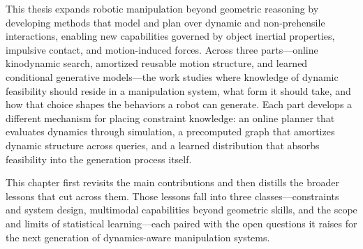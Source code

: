 This thesis expands robotic manipulation beyond geometric reasoning by developing methods that model and plan over dynamic and non-prehensile interactions, enabling new capabilities governed by object inertial properties, impulsive contact, and motion-induced forces.
Across three parts---online kinodynamic search, amortized reusable motion structure, and learned conditional generative models---the work studies where knowledge of dynamic feasibility should reside in a manipulation system, what form it should take, and how that choice shapes the behaviors a robot can generate.
Each part develops a different mechanism for placing constraint knowledge: an online planner that evaluates dynamics through simulation, a precomputed graph that amortizes dynamic structure across queries, and a learned distribution that absorbs feasibility into the generation process itself.

This chapter first revisits the main contributions and then distills the broader lessons that cut across them.
Those lessons fall into three classes---constraints and system design, multimodal capabilities beyond geometric skills, and the scope and limits of statistical learning---each paired with the open questions it raises for the next generation of dynamics-aware manipulation systems.
